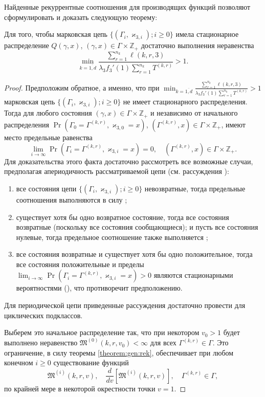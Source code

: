 \documentclass[a4paper,12pt,russian]{extarticle}
\newcommand{\MarkThree}{\{(\Gamma_i, \varkappa_{3,i}); i \geqslant 0\}}
\begin{document}
Найденные рекуррентные соотношения для производящих функций позволяют сформулировать и доказать следующую теорему:
\begin{theorem}
Для того, чтобы марковская цепь $\MarkThree$ имела стационарное распределение $Q(\gamma,x)$, $(\gamma,x)\in \Gamma \times {\mathbb Z}_+$ достаточно выполнения неравенства 
$$
\min_{k=\overline{1,d}} { \frac{\sum_{r = 1}^{n_k} \ell(k,r,3) }{\lambda_3 f_3'(1) \sum_{r=1}^{n_k} T^{(k,r)} }}>1.
$$
\end{theorem}
\begin{proof}
Предположим обратное, а именно, что при $\min_{k=\overline{1,d}} { \frac{\sum_{r = 1}^{n_k} \ell(k,r,3) }{\lambda_3 f_3'(1) \sum_{r=1}^{n_k} T^{(k,r)} }}
>1$ марковская цепь $\MarkThree$ не имеет стационарного распределения. 
Тогда для любого состояния $(\gamma,x)\in \Gamma \times {\mathbb Z}_+$ и независимо от начального распределения $\Pr(\Gamma_{0}=\Gamma^{(k,r)}, \varkappa_{3,0}=x)$,
$(\Gamma^{(k,r)},x)\in \Gamma \times {\mathbb Z}_+$, 
имеют место предельные равенства 
\begin{equation}
\lim_{i \to \infty} \Pr(\Gamma_{i}=\Gamma^{(k,r)}, \varkappa_{3,i}=x) =0, \quad  (\Gamma^{(k,r)},x)\in \Gamma \times {\mathbb Z}_+.
\label{zero:limit:equations}
\end{equation} 
Для доказательства этого факта достаточно рассмотреть все возможные случаи, предполагая апериодичность рассматриваемой цепи (см. рассуждения \cite[гл. $3$, пар.~3-4]{Shiryaev}):
\begin{enumerate}
\item все состояния цепи $\MarkThree$ невозвратные, тогда предельные соотношения выполняются в силу \cite[с. 541, лемма $2$]{Shiryaev};
\item существует хотя бы одно возвратное состояние, тогда все состояния возвратные (поскольку все состояния сообщающиеся); и пусть все состояния нулевые, тогда предельное соотношение также выполняется \cite[с. 541, лемма $3$]{Shiryaev};
\item все состояния возвратные и существует хотя бы одно положительное, тогда все состояния положительные и пределы $\lim_{i \to \infty} \Pr(\Gamma_{i}=\Gamma^{(k,r)}, \varkappa_{3,i}=x) > 0$ являются стационарными вероятностями (\cite[с. 549, теорема $1$]{Shiryaev}), что противоречит предположению.
\end{enumerate}
Для периодической цепи приведенные рассуждения достаточно провести для циклических подклассов.

Выберем это начальное распределение так, что при некотором $v_0 >1$  будет выполнено неравенство $\mathfrak{M}^{(0)}(k,r,v_0) <\infty$ для всех $\Gamma^{(k,r)}\in \Gamma$. Это ограничение, в силу теоремы \eqref{theorem:gen:rek}, обеспечивает при любом конечном $i\geqslant 0$ существование функций 
\begin{equation}
\mathfrak{M}^{(i)}(k,r,v),\quad \frac{d}{dv} \left[\mathfrak{M}^{(i)}(k,r,v)\right], \quad \Gamma^{(k,r)} \in \Gamma,
\end{equation}
по крайней мере в некоторой окрестности точки $v=1$.


\end{proof}
\end{document}
